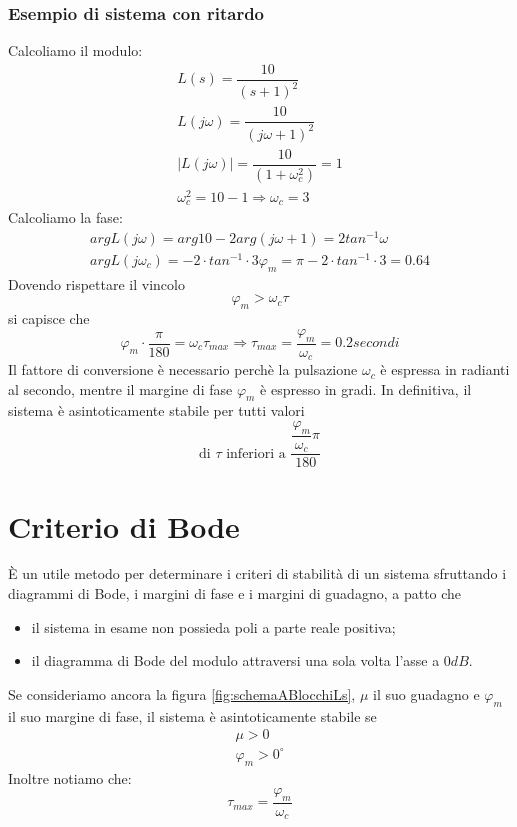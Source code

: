 \documentclass[a4paper]{report}
\begin{document}
\subsubsection{Esempio di sistema con ritardo}
Calcoliamo il modulo:
\[
\begin{array}{l}
  L(s) = \dfrac{10}{(s + 1)^2}\\
  L(j \omega) = \dfrac{10}{(j \omega +1)^2}\\
  |L(j \omega)| = \dfrac{10}{(1 + \omega_c^2)} = 1\\
  \omega_c^2 = 10 -1 \Rightarrow \omega_c = 3
\end{array}
\]
Calcoliamo la fase:
\[
\begin{array}{l}
  arg L(j \omega) = arg 10 - 2 arg (j \omega + 1) = 2 tan^{-1}
  \omega\\
  arg L(j \omega_c) = -2 \cdot tan^{-1} \cdot 3
  \varphi_m = \pi - 2 \cdot tan^{-1} \cdot 3 = 0.64
\end{array}
\]
Dovendo rispettare il vincolo
\[
\varphi_m > \omega_c \tau
\]
si capisce che
\[
\varphi_m \cdot \dfrac{\pi}{180}= \omega_c \tau_{max} \Rightarrow
\tau_{max} = \dfrac{\varphi_m}{\omega_c} = 0.2 secondi
\]
Il fattore di conversione \`e necessario perch\`e la pulsazione
$\omega_c$ \`e espressa in radianti al secondo, mentre il margine di
fase $\varphi_m$ \`e espresso in gradi. In definitiva, il sistema \`e
asintoticamente stabile per tutti valori
\[
\textrm{di } \tau \textrm{ inferiori a }
\dfrac{\dfrac{\varphi_m}{\omega_c}\pi}{180}
\]
\section{Criterio di Bode}\label{criterioDiBode}
\`E un utile metodo per determinare i criteri di stabilit\`a di un
sistema sfruttando i diagrammi di Bode, i margini di fase e i margini
di guadagno, a patto che
\begin{itemize}
\item il sistema in esame non possieda poli a parte reale positiva;
\item il diagramma di Bode del modulo attraversi una sola volta l'asse
  a $0 dB$.
\end{itemize}
Se consideriamo ancora la figura \ref{fig:schemaABlocchiLs}, $\mu$ il
suo guadagno e $\varphi_m$ il suo margine di fase, il sistema \`e
asintoticamente stabile se
\[
\begin{array}{l}
  \mu > 0\\
  \varphi_m > 0^{\circ}
\end{array}
\]
Inoltre notiamo che:
\[
\tau_{max} = \dfrac{\varphi_m}{\omega_c}
\]
\end{document}
